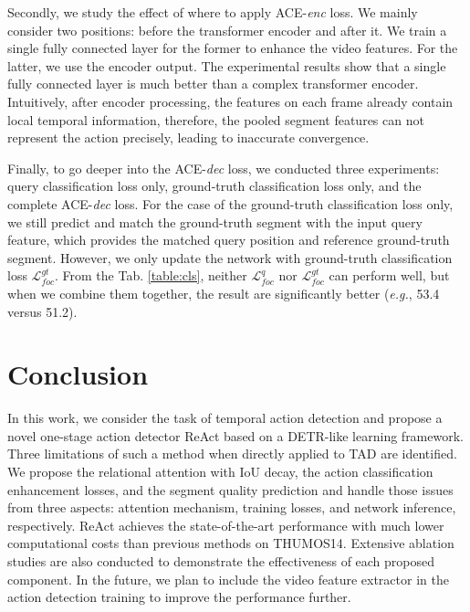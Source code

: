 \documentclass[runningheads]{llncs}
\def\eg{{\em e.g.}}
\newcommand{\tabref}[1]{Tab. \ref{#1}}
\newcommand{\mc}[1]{\mathcal{#1}}
\def\name{ReAct }
\begin{document}
Secondly, we study the effect of where to apply ACE-\emph{enc} loss. We mainly consider two positions: before the transformer encoder and after it. We train a single fully connected layer for the former to enhance the video features. For the latter, we use the encoder output. The experimental results show that a single fully connected layer is much better than a complex transformer encoder. Intuitively, after encoder processing, the features on each frame already contain local temporal information, therefore, the pooled segment features can not represent the action precisely, leading to inaccurate convergence.

Finally, to go deeper into the ACE-\emph{dec} loss, we conducted three experiments: query classification loss only, ground-truth classification loss only, and the complete ACE-\emph{dec} loss. For the case of the ground-truth classification loss only, we still predict and match the ground-truth segment with the input query feature, which provides the matched query position and reference ground-truth segment. However, we only update the network with ground-truth classification loss $\mc{L}_{foc}^{gt}$. From the \tabref{table:cls}, neither $\mc{L}_{foc}^{q}$ nor $\mc{L}_{foc}^{gt}$ can perform well, but when we combine them together, the result are significantly better (\eg, 53.4 versus 51.2). 













\section{Conclusion}
In this work, we consider the task of temporal action detection and propose a novel one-stage action detector \name based on a DETR-like learning framework. Three limitations of such a method when directly applied to TAD are identified. We propose the relational attention with IoU decay, the action classification enhancement losses, and the segment quality prediction and handle those issues from three aspects: attention mechanism, training losses, and network inference, respectively. \name achieves the state-of-the-art performance with much lower computational costs than previous methods on THUMOS14. Extensive ablation studies are also conducted to demonstrate the effectiveness of each proposed component. In the future, we plan to include the video feature extractor in the action detection training to improve the performance further. 
\end{document}
